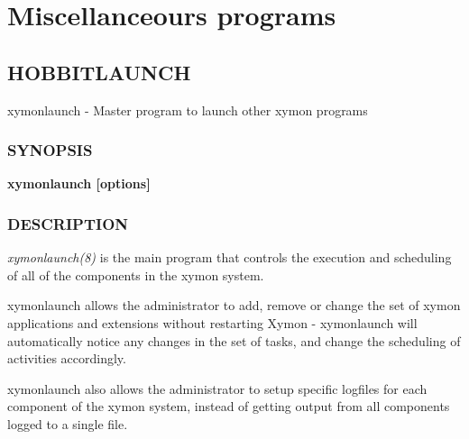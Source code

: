 %
\chapter{Miscellanceours programs}

%
\newpage
\section{HOBBITLAUNCH}
 xymonlaunch - Master program to launch other xymon programs 

 
\subsection{SYNOPSIS}
\textbf{xymonlaunch [options]}


 
\subsection{DESCRIPTION}
\emph{xymonlaunch(8)} is the main program that controls the execution
and scheduling of all of the components in the xymon system. 


  xymonlaunch allows the administrator to add, remove or change the
  set of xymon applications and extensions without restarting Xymon
  - xymonlaunch will automatically notice any changes in the set of
  tasks, and change the scheduling of activities accordingly. 



  xymonlaunch also allows the administrator to setup specific
  logfiles for each component of the xymon system, instead of getting
  output from all components logged to a single file. 



 
